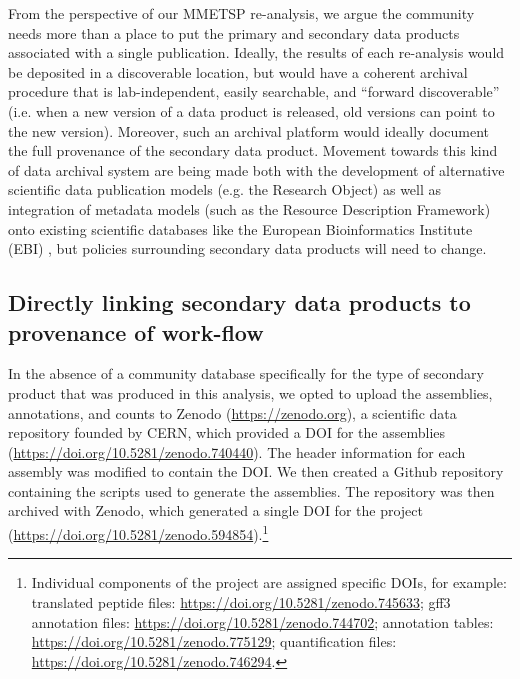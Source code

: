 \documentclass[a4paper,num-refs]{oup-contemporary}
\begin{document}
From the perspective of our MMETSP re-analysis, we argue the community needs more than a place to put the primary and secondary data products associated with a single publication. Ideally, the results of each re-analysis would be deposited in a discoverable location, but would have a coherent archival procedure that is lab-independent, easily searchable, and ``forward discoverable'' (i.e. when a  new version of a data product is released, old versions can point to the new version). Moreover, such an archival platform would ideally document the full provenance of the secondary data product. Movement towards this kind of data archival system are being made both with the development of alternative scientific data publication models (e.g. the Research Object\cite{Bechhofer2013}) as well as integration of metadata models (such as the Resource Description Framework) onto existing scientific databases like the European Bioinformatics Institute (EBI) \cite{Callahan2013}, but policies surrounding secondary data products will need to change.

\subsection{Directly linking secondary data products to provenance of work-flow}


In the absence of a community database specifically for the type of
secondary product that was produced in this analysis, we opted to
upload the assemblies, annotations, and counts to Zenodo
(\href{https://zenodo.org}{https://zenodo.org}), a scientific data repository founded by CERN,
which provided a DOI for the assemblies (\href{https://doi.org/10.5281/zenodo.740440}{https://doi.org/10.5281/zenodo.740440}).
The header information for each assembly was modified to contain the DOI. We then created a Github
repository containing the scripts used to generate the assemblies.
The repository was then archived with Zenodo,
which generated a single DOI for the project
(\href{https://doi.org/10.5281/zenodo.594854}{https://doi.org/10.5281/zenodo.594854}).\footnote{Individual components of the project are assigned specific DOIs, for example: translated peptide files: \href{https://doi.org/10.5281/zenodo.745633}{https://doi.org/10.5281/zenodo.745633};
gff3 annotation files: \href{https://doi.org/10.5281/zenodo.744702}{https://doi.org/10.5281/zenodo.744702};
annotation tables: \href{https://doi.org/10.5281/zenodo.775129}{https://doi.org/10.5281/zenodo.775129};
quantification files: \href{https://doi.org/10.5281/zenodo.746294}{https://doi.org/10.5281/zenodo.746294}.}
\end{document}

